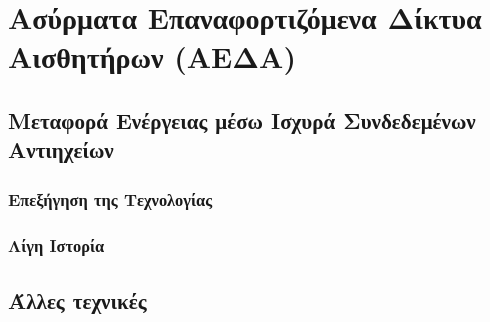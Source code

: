 

\chapter{Ασύρματα Επαναφορτιζόμενα Δίκτυα Αισθητήρων (ΑΕΔΑ)}
\section{Μεταφορά Ενέργειας μέσω Ισχυρά Συνδεδεμένων Αντιηχείων}
\subsection{Επεξήγηση της Τεχνολογίας}
\subsection{Λίγη Ιστορία}
\section{Άλλες τεχνικές}
\label{ch:wrsns}